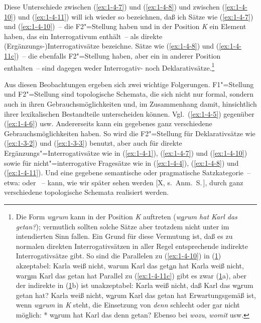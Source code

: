 \documentclass[output=paper]{langsci/langscibook}
\begin{document}
Diese Unterschiede zwischen (\ref{ex:1-4-7}) und (\ref{ex:1-4-8}) und
zwischen (\ref{ex:1-4-10}) und (\ref{ex:1-4-11}) will ich wieder so
bezeichnen, daß ich Sätze wie (\ref{ex:1-4-7}) und
(\ref{ex:1-4-10})~-- die F2"=Stellung haben und in der Position
\textit{K} ein Element haben, das ein Interrogativum enthält~-- als
direkte (Ergänzungs-)Interrogativsätze bezeichne. Sätze wie
(\ref{ex:1-4-8}) und (\ref{ex:1-4-11c})~-- die ebenfalls F2"=Stellung
haben, aber ein  in anderer Position enthalten~--
sind dagegen weder Interrogativ- noch Deklarativsätze.\footnote{%
   Die Form \textit{w\underline{\underline{a}}rum} kann in der Position \textit{K} auftreten
   (\textit{w\underline{\underline{a}}rum hat Karl das getan?}); vermutlich sollten solche
   Sätze aber trotzdem nicht unter  im intendierten
   Sinn fallen. Ein Grund für diese Vermutung ist, daß es zu normalen
   direkten Interrogativsätzen in aller Regel entsprechende indirekte
   Interrogativsätze gibt. So sind die Parallelen zu (\ref{ex:1-4-10})
   in (\ref{ex:1-fn18i}) akzeptabel:
   \eal
   \label{ex:1-fn18i}
   \ex
   \label{ex:1-fn18ia}
   Karla weiß nicht, warum Karl das get\underline{\underline{a}}n hat
   \ex
   \label{ex:1-fn18ib}
   Karla weiß nicht, war\underline{\underline{u}}m Karl das getan hat
   \zl
   Parallel zu (\ref{ex:1-4-11c}) gibt es zwar (\ref{ex:1-fn18ii}a), aber der indirekte  in (\ref{ex:1-fn18ii}b) ist unakzeptabel:
   \eal
   \label{ex:1-fn18ii}
   \ex
   \label{ex:1-fn18iia}
   Karla weiß nicht, daß Karl das w\underline{\underline{a}}rum getan hat?
   \ex
   \label{ex:1-fn18iib}
   Karla weiß nicht, w\underline{\underline{a}}rum Karl das getan hat
   \zl
   Erwartungsgemäß ist, wenn \textit{w\underline{\underline{a}}rum} in \textit{K} steht, die Einsetzung von \textit{denn} schlecht oder gar nicht möglich:
   \ea
   \label{ex:1-fn18iii}
   * w\underline{\underline{a}}rum hat Karl das denn getan?
   \z
   Ebenso bei \textit{wozu}, \textit{womit} usw.%
}

Aus diesen Beobachtungen ergeben sich zwei wichtige Folgerungen. F1"=Stel\-lung
und F2"=Stellung sind topologische Schemata, die sich nicht nur formal, sondern auch
in ihren Gebrauchsmöglichkeiten und, im Zusammenhang damit, hinsichtlich ihrer
lexikalischen Bestandteile unterscheiden können. Vgl.\ (\ref{ex:1-4-5}) gegenüber (\ref{ex:1-4-6}) usw. Andererseits kann ein gegebenes  ganz verschiedene Gebrauchsmöglichkeiten haben. So wird die F2"=Stellung \zb für Deklarativsätze wie (\ref{ex:1-3-2}) und (\ref{ex:1-3-3}) benutzt, aber
auch für direkte Ergänzungs"=Interrogativsätze wie in (\ref{ex:1-4-1}), (\ref{ex:1-4-7}) und (\ref{ex:1-4-10}) sowie für
nicht"=interrogative Fragesätze wie in (\ref{ex:1-4-4}), (\ref{ex:1-4-8}) und (\ref{ex:1-4-11}). Und eine gegebene semantische oder pragmatische Satzkategorie~-- etwa:  oder ~-- kann, wie wir später sehen werden [X, s.\ Anm.\ S.\,\pageref{fn-herausgeber-topo}]\label{X:1}, durch ganz verschiedene topologische Schemata
realisiert werden.
\end{document}
